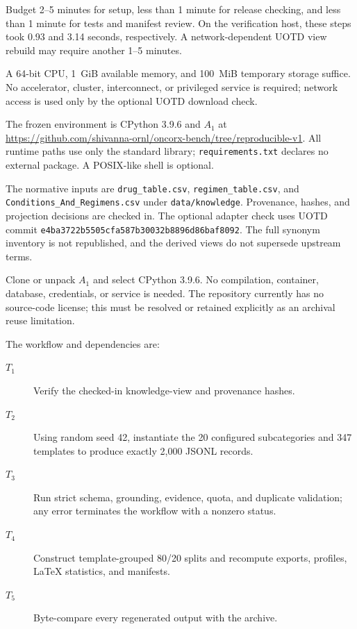 \documentclass[conference]{IEEEtran}
\newcommand{\CodeRevision}{\url{https://github.com/shivanna-ornl/oncorx-bench/tree/reproducible-v1}}
\newcommand{\UOTDCommitA}{\texttt{e4ba3722b5505cfa587b}}
\newcommand{\UOTDCommitB}{\texttt{30032b8896d86baf8092}}
\begin{document}
\arttime

Budget 2--5 minutes for setup, less than 1 minute for release checking, and
less than 1 minute for tests and manifest review.  On the verification host,
these steps took 0.93 and 3.14 seconds, respectively.  A network-dependent UOTD
view rebuild may require another 1--5 minutes.

\artin


A 64-bit CPU, 1~GiB available memory, and 100~MiB temporary storage suffice.
No accelerator, cluster, interconnect, or privileged service is required;
network access is used only by the optional UOTD download check.


The frozen environment is CPython 3.9.6 and $A_1$ at \CodeRevision.  All
runtime paths use only the standard library; \texttt{requirements.txt}
declares no external package.  A POSIX-like shell is optional.


The normative inputs are \texttt{drug\_table.csv},
\texttt{regimen\_table.csv}, and \texttt{Conditions\_And\_Regimens.csv} under
\texttt{data/knowledge}.  Provenance, hashes, and projection decisions are
checked in.  The optional adapter check uses UOTD commit
\UOTDCommitA\allowbreak\UOTDCommitB.  The full synonym inventory is not
republished, and the derived views do not supersede upstream terms.


Clone or unpack $A_1$ and select CPython 3.9.6.  No compilation, container,
database, credentials, or service is needed.  The repository currently has no
source-code license; this must be resolved or retained explicitly as an
archival reuse limitation.

\artcomp

The workflow and dependencies are:

\begin{description}
\item[$T_1$] Verify the checked-in knowledge-view and provenance hashes.
\item[$T_2$] Using random seed 42, instantiate the 20 configured subcategories
and 347 templates to produce exactly 2,000 JSONL records.
\item[$T_3$] Run strict schema, grounding, evidence, quota, and duplicate
validation; any error terminates the workflow with a nonzero status.
\item[$T_4$] Construct template-grouped 80/20 splits and recompute exports,
profiles, LaTeX statistics, and manifests.
\item[$T_5$] Byte-compare every regenerated output with the archive.
\end{description}
\end{document}
